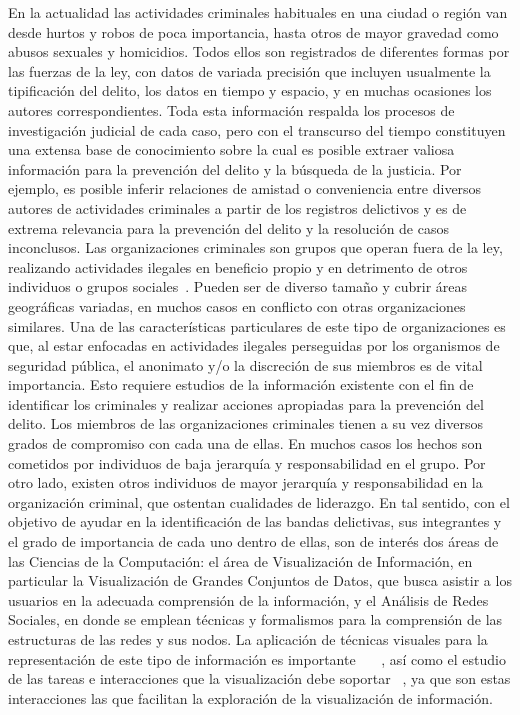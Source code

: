 
En la actualidad las actividades criminales habituales en una ciudad o región van desde hurtos y robos de poca importancia, hasta otros de mayor gravedad como abusos sexuales y  homicidios. Todos ellos son registrados de diferentes formas por las fuerzas de la ley, con datos de variada precisión que incluyen usualmente la tipificación del delito, los datos en tiempo y espacio, y en muchas ocasiones los autores correspondientes.
Toda esta información respalda los procesos de investigación judicial de cada caso, pero con el transcurso del tiempo constituyen una extensa base de conocimiento sobre la cual es posible extraer valiosa información para la prevención del delito y la búsqueda de la justicia. 
Por ejemplo, es posible inferir relaciones de amistad o conveniencia entre diversos autores de actividades criminales a partir de los registros delictivos y es de extrema relevancia para la prevención del delito y la resolución de casos inconclusos.
Las organizaciones criminales son grupos que operan fuera de la ley, realizando actividades ilegales en beneficio propio y en detrimento de otros individuos o grupos sociales~\cite{finckenauer2005problems}. Pueden ser de diverso tamaño y cubrir áreas geográficas variadas, en muchos casos en conflicto con otras organizaciones similares. Una de las características particulares de este tipo de organizaciones es que, al estar enfocadas en actividades ilegales perseguidas por los organismos de seguridad pública, el anonimato y/o la discreción de sus miembros es de vital importancia. Esto requiere estudios de la información existente con el fin de identificar los criminales y realizar acciones apropiadas para la prevención del delito.
Los miembros de las organizaciones criminales tienen a su vez diversos grados de compromiso con cada una de ellas. En muchos casos los hechos son cometidos por individuos de baja jerarquía y responsabilidad en el grupo. Por otro lado, existen otros individuos de mayor jerarquía y responsabilidad en la organización criminal, que ostentan cualidades de liderazgo.
En tal sentido, con el objetivo de ayudar en la identificación de las bandas delictivas, sus integrantes y el grado de importancia de cada uno dentro de ellas, son de interés dos áreas de las Ciencias de la Computación: el área de Visualización de Información, en particular la Visualización de Grandes Conjuntos de Datos, que busca asistir a los usuarios en la adecuada comprensión de la información, y el Análisis de Redes Sociales, en donde se emplean técnicas y formalismos para la comprensión de las estructuras de las redes y sus nodos. 
La aplicación de técnicas visuales para la representación de este tipo de información es importante ~\cite{xu2005criminal}~\cite{feng2019big}~\cite{mathew2021criminal}, así como el estudio de las tareas e interacciones que la visualización debe soportar ~\cite{chen2005visualization}, ya que son estas interacciones las que facilitan la exploración de la visualización de información.

